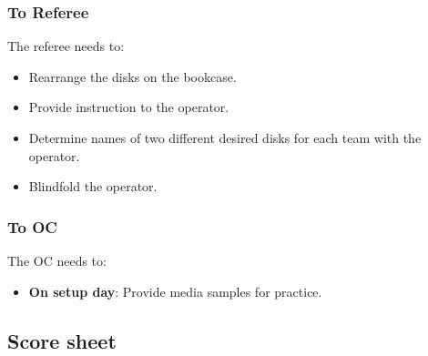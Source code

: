 \subsubsection*{To Referee}

The referee needs to:
\begin{itemize}
	\item Rearrange the disks on the bookcase.
	\item Provide instruction to the operator.
	\item Determine names of two different desired disks for each team with the operator. 
	\item Blindfold the operator.
\end{itemize}

\subsubsection*{To OC}
The OC needs to:
\begin{itemize}[nosep]
	\item \textbf{On setup day}: Provide media samples for practice.
\end{itemize}

\subsection*{Score sheet}


